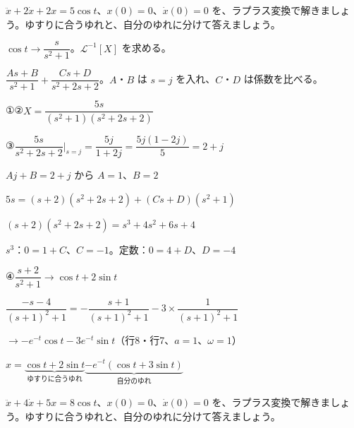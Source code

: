 \begin{reidai}[強制振動]
$\ddot x+2\dot x+2x=5\cos t$、$x(0)=0$、$\dot x(0)=0$ を、ラプラス変換で解きましょう。ゆすりに合うゆれと、自分のゆれに分けて答えましょう。\par
\kangaekata {}\par
{}\enspace $\cos t\to\dfrac{s}{s^2+1}$。$\mathcal L^{-1}[X]$ を求める。\par
{}\enspace $\dfrac{As+B}{s^2+1}+\dfrac{Cs+D}{s^2+2s+2}$。$A$・$B$ は $s=j$ を入れ、$C$・$D$ は係数を比べる。\par
\shiki\kixhs{}\zw{} ①②\enspace $X=\dfrac{5s}{(s^2+1)(s^2+2s+2)}$\par
\kixha ③\enspace $\dfrac{5s}{s^2+2s+2}\Big|_{s=j}=\dfrac{5j}{1+2j}=\dfrac{5j(1-2j)}{5}=2+j$\par
\kixhb $Aj+B=2+j$ から $A=1$、$B=2$\par
\kixhb $5s=(s+2)(s^2+2s+2)+(Cs+D)(s^2+1)$\par
\kixhb $(s+2)(s^2+2s+2)=s^3+4s^2+6s+4$\par
\kixhb $s^3$：$0=1+C$、$C=-1$。\enspace 定数：$0=4+D$、$D=-4$\par
\kixha ④\enspace $\dfrac{s+2}{s^2+1}\to\cos t+2\sin t$\par
\kixhb $\dfrac{-s-4}{(s+1)^2+1}=-\dfrac{s+1}{(s+1)^2+1}-3\times\dfrac{1}{(s+1)^2+1}$\par
\kixhb $\to-e^{-t}\cos t-3e^{-t}\sin t$\quad （行8・行7、$a=1$、$\omega=1$）\par
\kotae $x=\underbrace{\cos t+2\sin t}_{\text{ゆすりに合うゆれ}}\underbrace{-e^{-t}(\cos t+3\sin t)}_{\text{自分のゆれ}}$
\end{reidai}

\begin{jibun}
$\ddot x+4\dot x+5x=8\cos t$、$x(0)=0$、$\dot x(0)=0$ を、ラプラス変換で解きましょう。ゆすりに合うゆれと、自分のゆれに分けて答えましょう。
\end{jibun}

